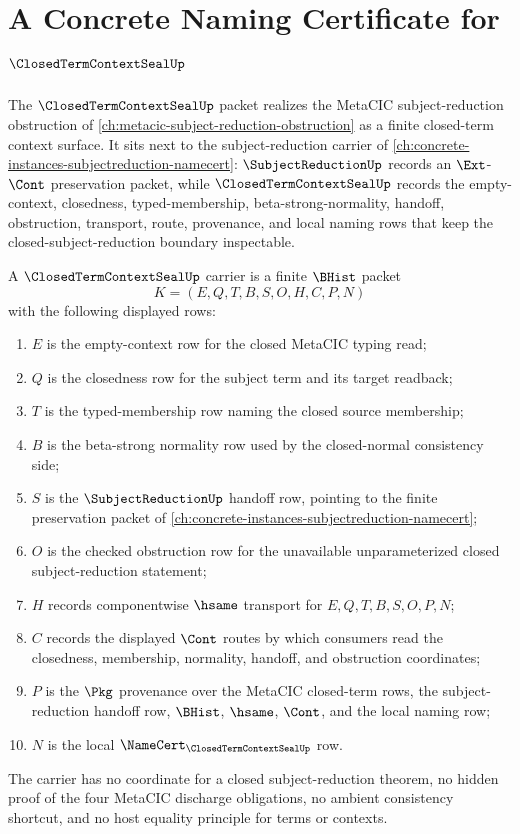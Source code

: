 \chapter{A Concrete Naming Certificate for $\ClosedTermContextSealUp$}
\label{ch:concrete-instances-closedtermcontextseal-namecert}

The $\ClosedTermContextSealUp$ packet realizes the MetaCIC subject-reduction obstruction of \autoref{ch:metacic-subject-reduction-obstruction} as a finite closed-term context surface. It sits next to the subject-reduction carrier of \autoref{ch:concrete-instances-subjectreduction-namecert}: $\SubjectReductionUp$ records an $\Ext$-$\Cont$ preservation packet, while $\ClosedTermContextSealUp$ records the empty-context, closedness, typed-membership, beta-strong-normality, handoff, obstruction, transport, route, provenance, and local naming rows that keep the closed-subject-reduction boundary inspectable.

\begin{definition}
\label{def:closed-term-context-seal-carrier}
A $\ClosedTermContextSealUp$ carrier is a finite $\BHist$ packet
$$
K=(E,Q,T,B,S,O,H,C,P,N)
$$
with the following displayed rows:
\begin{enumerate}
\item $E$ is the empty-context row for the closed MetaCIC typing read;
\item $Q$ is the closedness row for the subject term and its target readback;
\item $T$ is the typed-membership row naming the closed source membership;
\item $B$ is the beta-strong normality row used by the closed-normal consistency side;
\item $S$ is the $\SubjectReductionUp$ handoff row, pointing to the finite preservation packet of \autoref{ch:concrete-instances-subjectreduction-namecert};
\item $O$ is the checked obstruction row for the unavailable unparameterized closed subject-reduction statement;
\item $H$ records componentwise $\hsame$ transport for $E,Q,T,B,S,O,P,N$;
\item $C$ records the displayed $\Cont$ routes by which consumers read the closedness, membership, normality, handoff, and obstruction coordinates;
\item $P$ is the $\Pkg$ provenance over the MetaCIC closed-term rows, the subject-reduction handoff row, $\BHist$, $\hsame$, $\Cont$, and the local naming row;
\item $N$ is the local $\NameCert_{\ClosedTermContextSealUp}$ row.
\end{enumerate}
The carrier has no coordinate for a closed subject-reduction theorem, no hidden proof of the four MetaCIC discharge obligations, no ambient consistency shortcut, and no host equality principle for terms or contexts.
\end{definition}

